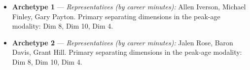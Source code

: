 \begin{itemize}
\item \textbf{Archetype 1} --- \emph{Representatives (by career minutes):} Allen Iverson, Michael Finley, Gary Payton. Primary separating dimensions in the peak-age modality: Dim 8, Dim 10, Dim 4.
\item \textbf{Archetype 2} --- \emph{Representatives (by career minutes):} Jalen Rose, Baron Davis, Grant Hill. Primary separating dimensions in the peak-age modality: Dim 8, Dim 10, Dim 4.
\end{itemize}

